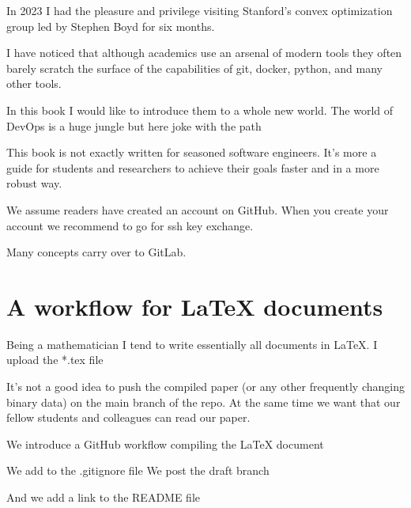

In 2023 I had the pleasure and privilege visiting Stanford's convex optimization group led by Stephen Boyd
for six months.

I have noticed that although academics use an arsenal of modern tools they often 
barely scratch the surface of the capabilities of git, docker, python, and many other tools.

In this book I would like to introduce them to a whole new world. The world of DevOps
is a huge jungle but here joke with the path

This book is not exactly written for seasoned software engineers. It's more a guide
for students and researchers to achieve their goals faster and in a more robust way.

We assume readers have created an account on GitHub. 
When you create your account we recommend to go for ssh key exchange.

Many concepts carry over to GitLab. 

\section{A workflow for LaTeX documents}
Being a mathematician I tend to write essentially all documents in LaTeX.
I upload the *.tex file

It's not a good idea to push the compiled paper (or any other frequently changing binary data) 
on the main branch of the repo. At the same time we want that our fellow students and colleagues
can read our paper. 

We introduce a GitHub workflow compiling the LaTeX document




We add to the .gitignore file
We post the draft branch

And we add a link to the README file





